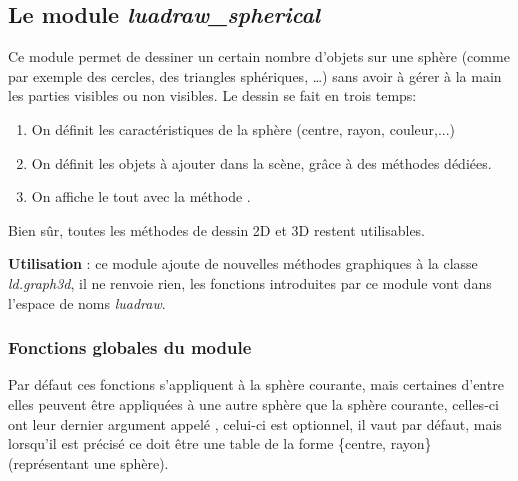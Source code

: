 \subsection{Le module \emph{luadraw\_spherical}}



Ce module permet de dessiner un certain nombre d'objets sur une sphère (comme par exemple des cercles, des triangles sphériques, \ldots) sans avoir à gérer à la main les parties visibles ou non visibles. Le dessin se fait en trois temps:
\begin{enumerate}
    \item On définit les caractéristiques de la sphère (centre, rayon, couleur,...)
    \item On définit les objets à ajouter dans la scène, grâce à des méthodes dédiées.
    \item On affiche le tout avec la méthode .
\end{enumerate}
Bien sûr, toutes les méthodes de dessin 2D et 3D restent utilisables.

\textbf{Utilisation} : ce module ajoute de nouvelles méthodes graphiques à la classe \emph{ld.graph3d}, il ne renvoie rien, les fonctions introduites par ce module vont dans l'espace de noms \emph{luadraw}.

\subsubsection{Fonctions globales du module}

Par défaut ces fonctions s'appliquent à la sphère courante, mais certaines d'entre elles peuvent être appliquées à une autre sphère que la sphère courante, celles-ci ont leur dernier argument appelé , celui-ci est optionnel, il vaut \nil par défaut, mais lorsqu'il est précisé ce doit être une table de la forme \{centre, rayon\} (représentant une sphère).

